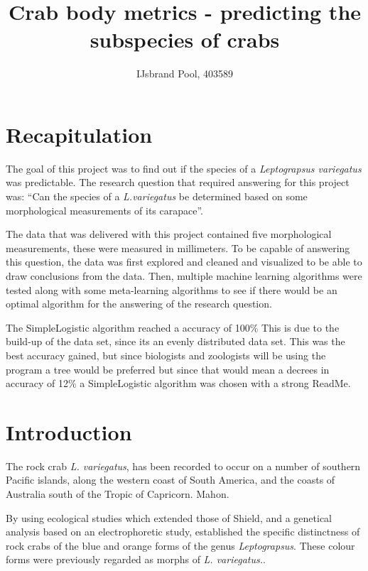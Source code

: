 \documentclass[
]{article}
\title{Crab body metrics - predicting the subspecies of crabs}
\author{IJsbrand Pool, 403589}
\date{}
\begin{document}
\maketitle

{
\hypersetup{linkcolor=}
\setcounter{tocdepth}{2}
\tableofcontents
}
\newpage

\hypertarget{recapitulation}{%
\section{Recapitulation}\label{recapitulation}}

The goal of this project was to find out if the species of a
\emph{Leptograpsus variegatus} was predictable. The research question
that required answering for this project was: ``Can the species of a
\emph{L.variegatus} be determined based on some morphological
measurements of its carapace''.

The data that was delivered with this project contained five
morphological measurements, these were measured in millimeters. To be
capable of answering this question, the data was first explored and
cleaned and visualized to be able to draw conclusions from the data.
Then, multiple machine learning algorithms were tested along with some
meta-learning algorithms to see if there would be an optimal algorithm
for the answering of the research question.

The SimpleLogistic algorithm reached a accuracy of 100\% This is due to
the build-up of the data set, since its an evenly distributed data set.
This was the best accuracy gained, but since biologists and zoologists
will be using the program a tree would be preferred but since that would
mean a decrees in accuracy of 12\% a SimpleLogistic algorithm was chosen
with a strong ReadMe.

\newpage

\hypertarget{introduction}{%
\section{Introduction}\label{introduction}}

The rock crab \emph{L. variegatus}, has been recorded to occur on a
number of southern Pacific islands, along the western coast of South
America, and the coasts of Australia south of the Tropic of Capricorn.
Mahon.

By using ecological studies which extended those of Shield, and a
genetical analysis based on an electrophoretic study, established the
specific distinctness of rock crabs of the blue and orange forms of the
genus \emph{Leptograpsus}. These colour forms were previously regarded
as morphs of \emph{L. variegatus.}.
\end{document}

